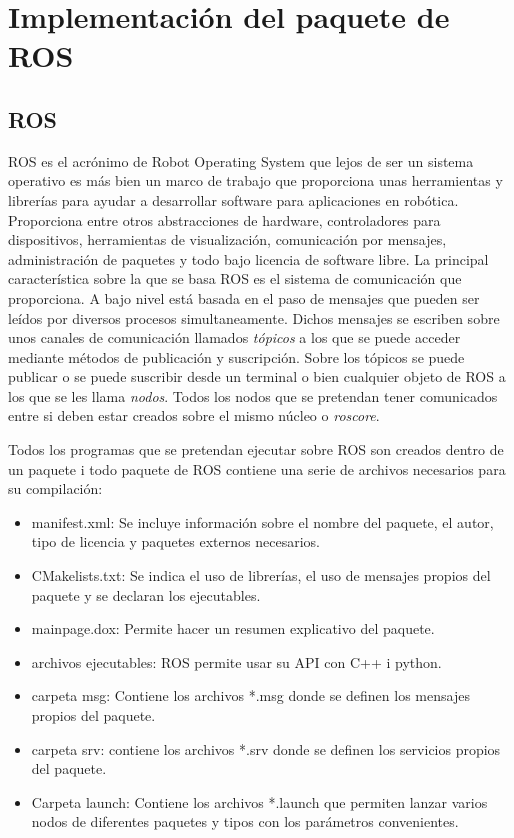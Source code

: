 \documentclass[12pt,a4paper,final,twoside]{article}
\begin{document}
\newpage
\section{Implementación del paquete de ROS}
\subsection{ROS}
\label{ros}
ROS es el acrónimo de Robot Operating System que lejos de ser un sistema operativo es más bien un marco de trabajo que proporciona unas herramientas y librerías para ayudar a desarrollar software para aplicaciones en robótica. Proporciona entre otros abstracciones de hardware, controladores para dispositivos, herramientas de visualización, comunicación por mensajes, administración de paquetes y todo bajo licencia de software libre.
La principal característica sobre la que se basa ROS es el sistema de comunicación que proporciona. A bajo nivel está basada en el paso de mensajes que pueden ser leídos por diversos procesos simultaneamente. Dichos mensajes se escriben sobre unos canales de comunicación llamados \textit{tópicos} a los que se puede acceder mediante métodos de publicación y suscripción. Sobre los tópicos se puede publicar o se puede suscribir desde un terminal o bien cualquier objeto de ROS a los que se les llama \textit{nodos}. Todos los nodos que se pretendan tener comunicados entre si deben estar creados sobre el mismo núcleo o \textit{roscore}.


Todos los programas que se pretendan ejecutar sobre ROS son creados dentro de un paquete i todo paquete de ROS contiene una serie de archivos necesarios para su compilación:
\begin{itemize}
\item manifest.xml: Se incluye información sobre el nombre del paquete, el autor, tipo de licencia y paquetes externos necesarios.
\item CMakelists.txt: Se indica el uso de librerías, el uso de mensajes propios del paquete y se declaran los ejecutables.
\item mainpage.dox: Permite hacer un resumen explicativo del paquete.
\item archivos ejecutables: ROS permite usar su API con C++ i python.
\item carpeta msg: Contiene los archivos *.msg donde se definen los mensajes propios del paquete.
\item carpeta srv: contiene los archivos *.srv donde se definen los servicios propios del paquete.
\item Carpeta launch: Contiene los archivos *.launch que permiten lanzar varios nodos de diferentes paquetes y tipos con los parámetros convenientes.

\end{itemize}
\end{document}
